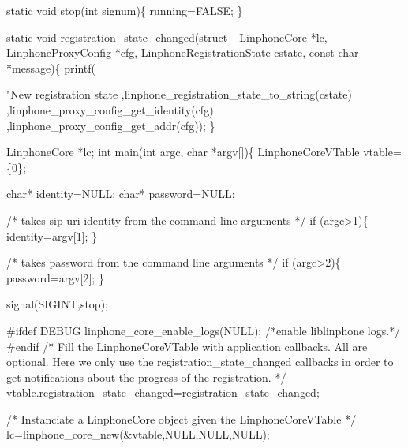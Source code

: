 \begin{DoxyCodeInclude}
\textcolor{keyword}{static} \textcolor{keywordtype}{void} stop(\textcolor{keywordtype}{int} signum)\{
        running=FALSE;
\}

\textcolor{keyword}{static} \textcolor{keywordtype}{void} registration\_state\_changed(\textcolor{keyword}{struct} \_LinphoneCore *lc, 
      LinphoneProxyConfig *cfg, LinphoneRegistrationState cstate, \textcolor{keyword}{const} \textcolor{keywordtype}{char} *message)\{
                printf(\textcolor{stringliteral}{"New registration state %
                                ,linphone_registration_state_to_string(cstate)
                                ,linphone_proxy_config_get_identity(cfg)
                                ,linphone_proxy_config_get_addr(cfg));
\}

LinphoneCore *lc;
\textcolor{keywordtype}{int} main(\textcolor{keywordtype}{int} argc, \textcolor{keywordtype}{char} *argv[])\{
        LinphoneCoreVTable vtable=\{0\};

        \textcolor{keywordtype}{char}* identity=NULL;
        \textcolor{keywordtype}{char}* password=NULL;

        \textcolor{comment}{/* takes   sip uri  identity from the command line arguments */}
        \textcolor{keywordflow}{if} (argc>1)\{
                identity=argv[1];
        \}

        \textcolor{comment}{/* takes   password from the command line arguments */}
        \textcolor{keywordflow}{if} (argc>2)\{
                password=argv[2];
        \}

        signal(SIGINT,stop);

\textcolor{preprocessor}{#ifdef DEBUG}
\textcolor{preprocessor}{}        linphone_core_enable_logs(NULL); \textcolor{comment}{/*enable liblinphone logs.*/}
\textcolor{preprocessor}{#endif}
\textcolor{preprocessor}{}        \textcolor{comment}{/* }
\textcolor{comment}{         Fill the LinphoneCoreVTable with application callbacks.}
\textcolor{comment}{         All are optional. Here we only use the registration\_state\_changed callbacks}
\textcolor{comment}{         in order to get notifications about the progress of the registration.}
\textcolor{comment}{         */}
        vtable.registration_state_changed=registration\_state\_changed;

        \textcolor{comment}{/*}
\textcolor{comment}{         Instanciate a LinphoneCore object given the LinphoneCoreVTable}
\textcolor{comment}{        */}
        lc=linphone_core_new(&vtable,NULL,NULL,NULL);

}
\end{DoxyCodeInclude}
